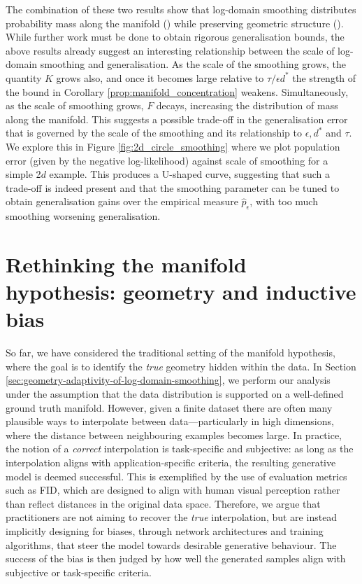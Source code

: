 \documentclass[10pt]{article}
\theoremstyle{plain}
\theoremstyle{definition}
\theoremstyle{remark}
\begin{document}
The combination of these two results show that log-domain smoothing distributes probability mass along the manifold () while preserving geometric structure (). While further work must be done to obtain rigorous generalisation bounds, the above results already suggest an interesting relationship between the scale of log-domain smoothing and generalisation. As the scale of the smoothing grows, the quantity \(K\) grows also, and once it becomes large relative to \(\tau/\epsilon d^*\) the strength of the bound in Corollary \ref{prop:manifold_concentration} weakens. Simultaneously, as the scale of smoothing grows, \(F\) decays, increasing the distribution of mass along the manifold. This suggests a possible trade-off in the generalisation error that is governed by the scale of the smoothing and its relationship to \(\epsilon, d^*\) and \(\tau\). We explore this in Figure \ref{fig:2d_circle_smoothing} where we plot population error (given by the negative log-likelihood) against scale of smoothing for a simple 2\(d\) example. This produces a U-shaped curve, suggesting that such a trade-off is indeed present and that the smoothing parameter can be tuned to obtain generalisation gains over the empirical measure \(\hat{p}_\epsilon\), with too much smoothing worsening generalisation.

\section{Rethinking the manifold hypothesis: geometry and inductive bias} \label{sec:geometric_bias}
So far, we have considered the traditional setting of the manifold hypothesis, where the goal is to identify the \emph{true} geometry hidden within the data. In Section \ref{sec:geometry-adaptivity-of-log-domain-smoothing}, we perform our analysis under the assumption that the data distribution is supported on a well-defined ground truth manifold.
However, given a finite dataset there are often many plausible ways to interpolate between data---particularly in high dimensions, where the distance between neighbouring examples becomes large. In practice, the notion of a \textit{correct} interpolation is task-specific and subjective: as long as the interpolation aligns with application-specific criteria, the resulting generative model is deemed successful. This is exemplified by the use of evaluation metrics such as FID, which are designed to align with human visual perception rather than reflect distances in the original data space.
Therefore, we argue that practitioners are not aiming to recover the \emph{true} interpolation, but are instead implicitly designing for biases, through network architectures and training algorithms, that steer the model towards desirable generative behaviour. The success of the bias is then judged by how well the generated samples align with subjective or task-specific criteria.
\end{document}
